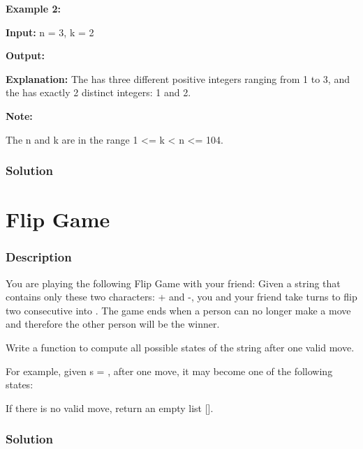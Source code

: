 \textbf{Example 2:}

\textbf{Input:} n = 3, k = 2

\textbf{Output:} \code{[1, 3, 2]}

\textbf{Explanation:} The \code{[1, 3, 2]} has three different positive integers ranging from 1 to 3, and the \code{[2, 1]} has exactly 2 distinct integers: 1 and 2.

\textbf{Note:}

The n and k are in the range 1 <= k < n <= 104.

\subsubsection{Solution}
\begin{Code}
\end{Code}

\newpage

\section{Flip Game} %
\subsubsection{Description}

You are playing the following Flip Game with your friend: Given a string that contains only these two characters: + and -, you and your friend take turns to flip two consecutive  into . The game ends when a person can no longer make a move and therefore the other person will be the winner.

Write a function to compute all possible states of the string after one valid move.

For example, given s = , after one move, it may become one of the following states:

\begin{Code}
[
  "--++",
  "+--+",
  "++--"
]
\end{Code}

If there is no valid move, return an empty list [].

\subsubsection{Solution}

\begin{Code}

\end{Code}

